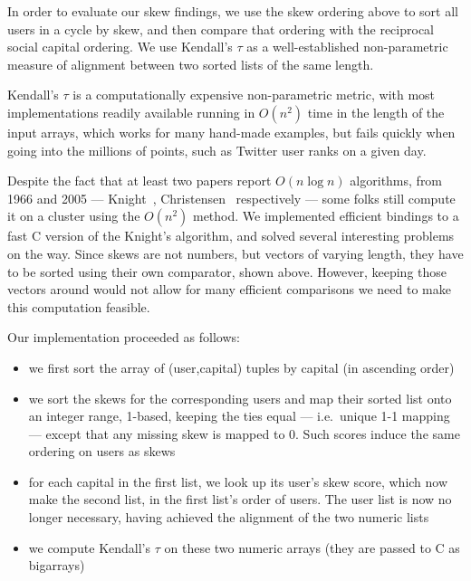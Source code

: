 \documentclass[10pt,oneside]{memoir}
\begin{document}
\label{listing:compare-skew}


In order to evaluate our skew findings, we use the skew ordering above to sort all users in a cycle by skew, and then compare that ordering with the reciprocal social capital ordering.  We use Kendall's $\tau$ as a well-established non-parametric measure of alignment between two sorted lists of the same length.


Kendall's $\tau$ is a computationally expensive non-parametric metric, with most implementations readily available running in $O(n^2)$ time in the length of the input arrays, which works for many hand-made examples, but fails quickly when going into the millions of points, such as Twitter user ranks on a given day.


Despite the fact that at least two papers report $O(n \log n)$ algorithms, from 1966 and 2005 --- Knight~\cite{knight1966computer}, Christensen~\cite{christensen2005fast-kendall} respectively --- some folks still compute it on a cluster using the $O(n^2)$ method.  We implemented efficient bindings to a fast C version of the Knight's algorithm, and solved several interesting problems on the way.  Since skews are not numbers, but vectors of varying length, they have to be sorted using their own comparator, shown above.  However, keeping those vectors around would not allow for many efficient comparisons we need to make this computation feasible.


Our implementation proceeded as follows:


\begin{itemize}


\item we first sort the array of (user,capital) tuples by capital (in ascending order)

\item we sort the skews for the corresponding users and map their sorted list onto an integer range, 1-based, keeping the ties equal --- i.e.\ unique 1-1 mapping --- except that any missing skew is mapped to 0.  Such scores induce the same ordering on users as skews

\item for each capital in the first list, we look up its user's skew score, which now make the second list, in the first list's order of users.  The user list is now no longer necessary, having achieved the alignment of the two numeric lists

\item we compute Kendall's $\tau$ on these two numeric arrays (they are passed to C as bigarrays)
\end{itemize}
\end{document}
